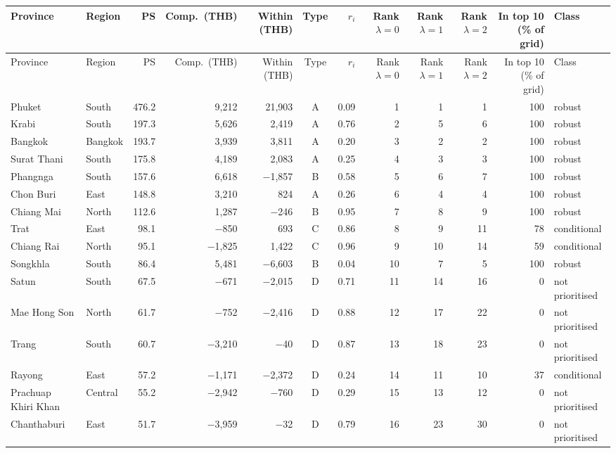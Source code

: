 \begin{longtable}{llrrrcrrrrrl}
\toprule
Province & Region & PS & Comp.\ (THB) & Within (THB) & Type & $r_i$ & Rank $\lambda{=}0$ & Rank $\lambda{=}1$ & Rank $\lambda{=}2$ & In top 10 (\% of grid) & Class \\
\midrule
\endfirsthead
\toprule
Province & Region & PS & Comp.\ (THB) & Within (THB) & Type & $r_i$ & Rank $\lambda{=}0$ & Rank $\lambda{=}1$ & Rank $\lambda{=}2$ & In top 10 (\% of grid) & Class \\
\midrule
\endhead
\bottomrule
\endfoot
Phuket & South & 476.2 & 9,212 & 21,903 & A & 0.09 & 1 & 1 & 1 & 100 & robust \\
Krabi & South & 197.3 & 5,626 & 2,419 & A & 0.76 & 2 & 5 & 6 & 100 & robust \\
Bangkok & Bangkok & 193.7 & 3,939 & 3,811 & A & 0.20 & 3 & 2 & 2 & 100 & robust \\
Surat Thani & South & 175.8 & 4,189 & 2,083 & A & 0.25 & 4 & 3 & 3 & 100 & robust \\
Phangnga & South & 157.6 & 6,618 & $-$1,857 & B & 0.58 & 5 & 6 & 7 & 100 & robust \\
Chon Buri & East & 148.8 & 3,210 & 824 & A & 0.26 & 6 & 4 & 4 & 100 & robust \\
Chiang Mai & North & 112.6 & 1,287 & $-$246 & B & 0.95 & 7 & 8 & 9 & 100 & robust \\
Trat & East & 98.1 & $-$850 & 693 & C & 0.86 & 8 & 9 & 11 & 78 & conditional \\
Chiang Rai & North & 95.1 & $-$1,825 & 1,422 & C & 0.96 & 9 & 10 & 14 & 59 & conditional \\
Songkhla & South & 86.4 & 5,481 & $-$6,603 & B & 0.04 & 10 & 7 & 5 & 100 & robust \\
Satun & South & 67.5 & $-$671 & $-$2,015 & D & 0.71 & 11 & 14 & 16 & 0 & not prioritised \\
Mae Hong Son & North & 61.7 & $-$752 & $-$2,416 & D & 0.88 & 12 & 17 & 22 & 0 & not prioritised \\
Trang & South & 60.7 & $-$3,210 & $-$40 & D & 0.87 & 13 & 18 & 23 & 0 & not prioritised \\
Rayong & East & 57.2 & $-$1,171 & $-$2,372 & D & 0.24 & 14 & 11 & 10 & 37 & conditional \\
Prachuap Khiri Khan & Central & 55.2 & $-$2,942 & $-$760 & D & 0.29 & 15 & 13 & 12 & 0 & not prioritised \\
Chanthaburi & East & 51.7 & $-$3,959 & $-$32 & D & 0.79 & 16 & 23 & 30 & 0 & not prioritised \\

\end{longtable}
